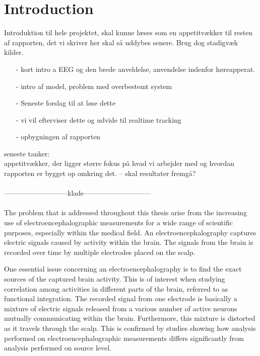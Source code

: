 \chapter*{Introduction}\label{ch:introduction}
Introduktion til hele projektet, skal kunne læses som en appetitvækker til resten af rapporten, det vi skriver her skal så uddybes senere. Brug dog stadigvæk kilder.

\begin{itemize}
\item[-] kort intro a EEG og den brede anveldelse, anvendelse indenfor høreapperat. 
\item[-] intro af model, problem med overbestemt system
\item[-] Seneste forslag til at løse dette 
\item[-] vi vil efterviser dette og udvide til realtime tracking
\item[-] opbygningen af rapporten
\end{itemize}
seneste tanker:\\
appetitvækker, der ligger større fokus på hvad vi arbejder med og hvordan rapporten er bygget op omkring det. -- skal resultater fremgå?   \\ \\
---------------------------klade-----------------------------\\ \\

The problem that is addressed throughout this thesis arise from the increasing use of electroencephalographic measurements for a wide range of scientific purposes, especially within the medical field. 
An electroencephalography captures electric signals caused by activity within the brain. The signals from the brain is recorded over time by multiple electrodes placed on the scalp.

One essential issue concerning an electroencephalography is to  
find the exact sources of the captured brain activity. This is of interest when studying correlation among activities in different parts of the brain, referred to as functional integration.  
The recorded signal from one electrode is basically a mixture of electric signals released from a various number of active neurons mutually communicating within the brain. 
Furthermore, this mixture is distorted as it travels through the scalp. This is confirmed by studies showing how analysis performed on electroencephalographic measurements differs significantly from analysis performed on source level\cite{Friston2002}.\\



              

